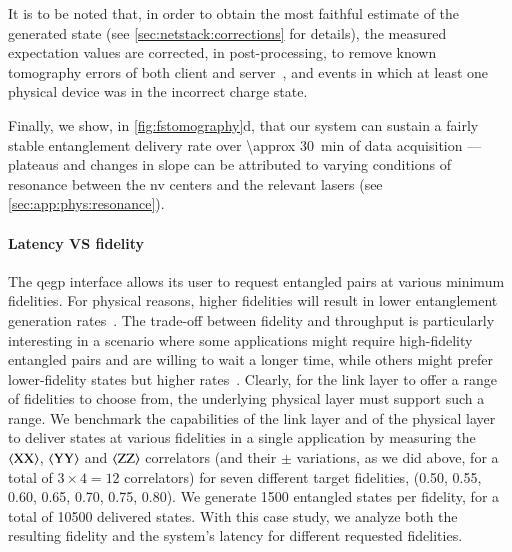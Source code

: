 It is to be noted that, in order to obtain the most faithful estimate of the generated state
(see \cref{sec:netstack:corrections} for details), the measured expectation values are corrected, in
post-processing, to remove known tomography errors of both client and
server~\cite{nachman_2020_unfolding}, and events in which at least one physical device was in the
incorrect charge state.

Finally, we show, in \cref{fig:fstomography}d, that our system can sustain a fairly stable
entanglement delivery rate over \qty{\approx 30}{min} of data acquisition --- plateaus and changes
in slope can be attributed to varying conditions of resonance between the \acrshort{nv} centers and
the relevant lasers (see \cref{sec:app:phys:resonance}).

\paragraph{Latency VS fidelity}

The \acrshort{qegp} interface allows its user to request entangled pairs at various minimum
fidelities. For physical reasons, higher fidelities will result in lower entanglement generation
rates~\cite{stockill_2017_phasetuned, humphreys_2018_delivery}. The trade-off between fidelity and
throughput is particularly interesting in a scenario where some applications might require
high-fidelity entangled pairs and are willing to wait a longer time, while others might prefer
lower-fidelity states but higher rates~\cite{dahlberg_2019_egp}. Clearly, for the link layer to
offer a range of fidelities to choose from, the underlying physical layer must support such a range.
We benchmark the capabilities of the link layer and of the physical layer to deliver states at
various fidelities in a single application by measuring the $\braket{\mathrm{XX}}$,
$\braket{\mathrm{YY}}$ and $\braket{\mathrm{ZZ}}$ correlators (and their $\pm$ variations, as we did
above, for a total of $3 \times 4 = 12$ correlators) for seven different target fidelities,
(\num{0.50}, \num{0.55}, \num{0.60}, \num{0.65}, \num{0.70}, \num{0.75}, \num{0.80}). We generate
\num{1500} entangled states per fidelity, for a total of \num{10500} delivered states. With this
case study, we analyze both the resulting fidelity and the system's latency for different requested
fidelities.

